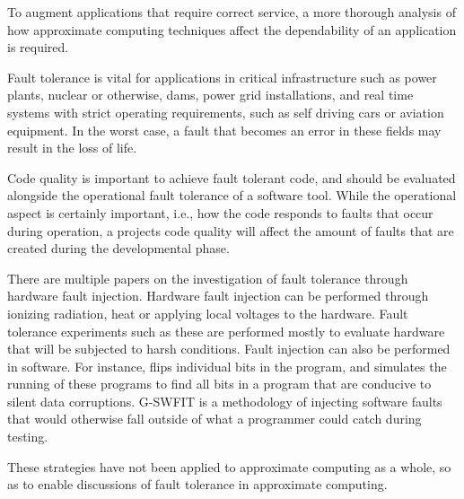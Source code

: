 To augment applications that require correct service, a more thorough analysis of how approximate computing techniques affect the dependability of an application is required.

Fault tolerance is vital for applications in critical infrastructure such as power plants, nuclear or otherwise, dams, power grid installations, and real time systems with strict operating requirements, such as self driving cars or aviation equipment. In the worst case, a fault that becomes an error in these fields may result in the loss of life. 

Code quality is important to achieve fault tolerant code, and should be evaluated alongside the operational fault tolerance of a software tool. While the operational aspect is certainly important, i.e., how the code responds to faults that occur during operation, a projects code quality will affect the amount of faults that are created during the developmental phase. 

There are multiple papers on the investigation of fault tolerance through hardware fault injection. Hardware fault injection can be performed through ionizing radiation, heat or applying local voltages to the hardware. Fault tolerance experiments such as these are performed mostly to evaluate hardware that will be subjected to harsh conditions. 
Fault injection can also be performed in software. For instance,  flips individual bits in the program, and simulates the running of these programs to find all bits in a program that are conducive to silent data corruptions.  G-SWFIT is a methodology of injecting software faults that would otherwise fall outside of what a programmer could catch during testing. 

These strategies have not been applied to approximate computing as a whole, so as to enable discussions of fault tolerance in approximate computing.

